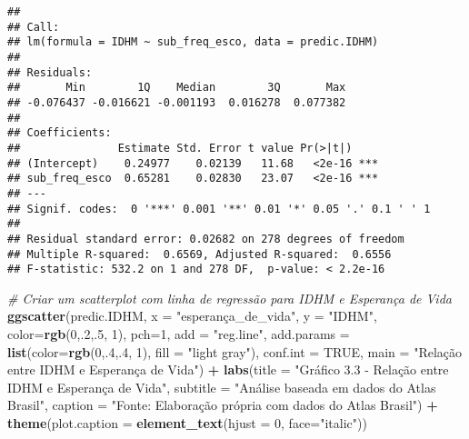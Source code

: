 \documentclass[
]{article}
\newenvironment{Shaded}{\begin{snugshade}}{\end{snugshade}}
\newcommand{\AttributeTok}[1]{\textcolor[rgb]{0.13,0.29,0.53}{#1}}
\newcommand{\CommentTok}[1]{\textcolor[rgb]{0.56,0.35,0.01}{\textit{#1}}}
\newcommand{\ConstantTok}[1]{\textcolor[rgb]{0.56,0.35,0.01}{#1}}
\newcommand{\DecValTok}[1]{\textcolor[rgb]{0.00,0.00,0.81}{#1}}
\newcommand{\FunctionTok}[1]{\textcolor[rgb]{0.13,0.29,0.53}{\textbf{#1}}}
\newcommand{\NormalTok}[1]{#1}
\newcommand{\SpecialCharTok}[1]{\textcolor[rgb]{0.81,0.36,0.00}{\textbf{#1}}}
\newcommand{\StringTok}[1]{\textcolor[rgb]{0.31,0.60,0.02}{#1}}
\begin{document}
\begin{verbatim}
## 
## Call:
## lm(formula = IDHM ~ sub_freq_esco, data = predic.IDHM)
## 
## Residuals:
##       Min        1Q    Median        3Q       Max 
## -0.076437 -0.016621 -0.001193  0.016278  0.077382 
## 
## Coefficients:
##               Estimate Std. Error t value Pr(>|t|)    
## (Intercept)    0.24977    0.02139   11.68   <2e-16 ***
## sub_freq_esco  0.65281    0.02830   23.07   <2e-16 ***
## ---
## Signif. codes:  0 '***' 0.001 '**' 0.01 '*' 0.05 '.' 0.1 ' ' 1
## 
## Residual standard error: 0.02682 on 278 degrees of freedom
## Multiple R-squared:  0.6569, Adjusted R-squared:  0.6556 
## F-statistic: 532.2 on 1 and 278 DF,  p-value: < 2.2e-16
\end{verbatim}

\begin{Shaded}
\begin{Highlighting}[]
\CommentTok{\# Criar um scatterplot com linha de regressão para IDHM e Esperança de Vida}
\FunctionTok{ggscatter}\NormalTok{(predic.IDHM, }\AttributeTok{x =} \StringTok{"esperança\_de\_vida"}\NormalTok{, }\AttributeTok{y =} \StringTok{"IDHM"}\NormalTok{, }
          \AttributeTok{color=}\FunctionTok{rgb}\NormalTok{(}\DecValTok{0}\NormalTok{,.}\DecValTok{2}\NormalTok{,.}\DecValTok{5}\NormalTok{,  }\DecValTok{1}\NormalTok{), }\AttributeTok{pch=}\DecValTok{1}\NormalTok{, }\AttributeTok{add =} \StringTok{"reg.line"}\NormalTok{, }
          \AttributeTok{add.params =} \FunctionTok{list}\NormalTok{(}\AttributeTok{color=}\FunctionTok{rgb}\NormalTok{(}\DecValTok{0}\NormalTok{,.}\DecValTok{4}\NormalTok{,.}\DecValTok{4}\NormalTok{,  }\DecValTok{1}\NormalTok{), }\AttributeTok{fill =} \StringTok{"light gray"}\NormalTok{), }
          \AttributeTok{conf.int =} \ConstantTok{TRUE}\NormalTok{, }\AttributeTok{main =} \StringTok{"Relação entre IDHM e Esperança de Vida"}\NormalTok{) }\SpecialCharTok{+}
  \FunctionTok{labs}\NormalTok{(}\AttributeTok{title =} \StringTok{"Gráfico 3.3 {-} Relação entre IDHM e Esperança de Vida"}\NormalTok{,}
       \AttributeTok{subtitle =} \StringTok{"Análise baseada em dados do Atlas Brasil"}\NormalTok{,}
       \AttributeTok{caption =} \StringTok{"Fonte: Elaboração própria com dados do Atlas Brasil"}\NormalTok{) }\SpecialCharTok{+}
  \FunctionTok{theme}\NormalTok{(}\AttributeTok{plot.caption =} \FunctionTok{element\_text}\NormalTok{(}\AttributeTok{hjust =} \DecValTok{0}\NormalTok{, }\AttributeTok{face=}\StringTok{"italic"}\NormalTok{))}
\end{Highlighting}
\end{Shaded}
\end{document}
